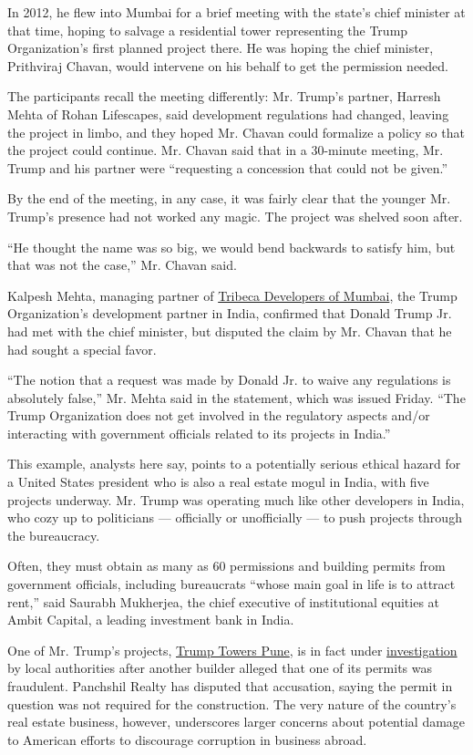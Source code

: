 In 2012, he flew into Mumbai for a brief meeting with the state's chief
minister at that time, hoping to salvage a residential tower
representing the Trump Organization's first planned project there. He
was hoping the chief minister, Prithviraj Chavan, would intervene on his
behalf to get the permission needed.

The participants recall the meeting differently: Mr. Trump's partner,
Harresh Mehta of Rohan Lifescapes, said development regulations had
changed, leaving the project in limbo, and they hoped Mr. Chavan could
formalize a policy so that the project could continue. Mr. Chavan said
that in a 30-minute meeting, Mr. Trump and his partner were ``requesting
a concession that could not be given.''

By the end of the meeting, in any case, it was fairly clear that the
younger Mr. Trump's presence had not worked any magic. The project was
shelved soon after.

``He thought the name was so big, we would bend backwards to satisfy
him, but that was not the case,'' Mr. Chavan said.

Kalpesh Mehta, managing partner of
\href{http://tribecadevelopers.com/trump/tribeca_trump.php}{Tribeca
Developers of Mumbai}, the Trump Organization's development partner in
India, confirmed that Donald Trump Jr. had met with the chief minister,
but disputed the claim by Mr. Chavan that he had sought a special favor.

``The notion that a request was made by Donald Jr. to waive any
regulations is absolutely false,'' Mr. Mehta said in the statement,
which was issued Friday. ``The Trump Organization does not get involved
in the regulatory aspects and/or interacting with government officials
related to its projects in India.''

This example, analysts here say, points to a potentially serious ethical
hazard for a United States president who is also a real estate mogul in
India, with five projects underway. Mr. Trump was operating much like
other developers in India, who cozy up to politicians --- officially or
unofficially --- to push projects through the bureaucracy.

Often, they must obtain as many as 60 permissions and building permits
from government officials, including bureaucrats ``whose main goal in
life is to attract rent,'' said Saurabh Mukherjea, the chief executive
of institutional equities at Ambit Capital, a leading investment bank in
India.

One of Mr. Trump's projects,
\href{http://www.trump.com/real-estate-portfolio/india/trump-towers-pune/}{Trump
Towers Pune}, is in fact under
\href{https://www.documentcloud.org/documents/3225252-2016-2-24-Complaint-Against-Trump-Tower-Pune.html}{investigation}
by local authorities after another builder alleged that one of its
permits was fraudulent. Panchshil Realty has disputed that accusation,
saying the permit in question was not required for the construction. The
very nature of the country's real estate business, however, underscores
larger concerns about potential damage to American efforts to discourage
corruption in business abroad.

